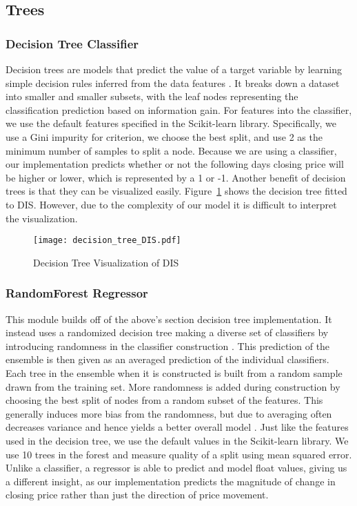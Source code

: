 \documentclass[../thesis.tex]{subfiles}
\begin{document}
\subsection{Trees}

\subsubsection{Decision Tree Classifier}
Decision trees are models that predict the value of a target variable by learning simple decision rules inferred from the data features \cite{PedregosaFABIANPEDREGOSA2011}. It breaks down a dataset into smaller and smaller subsets, with the leaf nodes representing the classification prediction based on information gain. For features into the classifier, we use the default features specified in the Scikit-learn library. Specifically, we use a Gini impurity for criterion, we choose the best split, and use 2 as the minimum number of samples to split a node. Because we are using a classifier, our implementation predicts whether or not the following days closing price will be higher or lower, which is represented by a 1 or -1. Another benefit of decision trees is that they can be visualized easily. Figure~\ref{DecTreefigure} shows the decision tree fitted to DIS. However, due to the complexity of our model it is difficult to interpret the visualization. 

\begin{figure}[h]
\centering
\texttt{[image: decision\_tree\_DIS.pdf]}
\caption{Decision Tree Visualization of DIS \label{overflow}}
\label{DecTreefigure}
\end{figure}

\subsubsection{RandomForest Regressor}
This module builds off of the above's section decision tree implementation. It instead uses a randomized decision tree making a diverse set of classifiers by introducing randomness in the classifier construction \cite{PedregosaFABIANPEDREGOSA2011}. This prediction of the ensemble is then given as an averaged prediction of the individual classifiers. Each tree in the ensemble when it is constructed is built from a random sample drawn from the training set. More randomness is added during construction by choosing the best split of nodes from a random subset of the features. This generally induces more bias from the randomness, but due to averaging often decreases variance and hence yields a better overall model \cite{PedregosaFABIANPEDREGOSA2011}. Just like the features used in the decision tree, we use the default values in the Scikit-learn library. We use 10 trees in the forest and measure quality of a split using mean squared error. Unlike a classifier, a regressor is able to predict and model float values, giving us a different insight, as our implementation predicts the magnitude of change in closing price rather than just the direction of price movement. 
\end{document}

